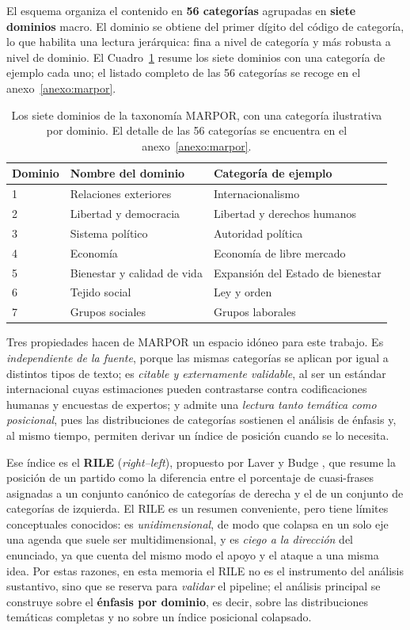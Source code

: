 El esquema organiza el contenido en \textbf{56 categorías} agrupadas en
\textbf{siete dominios} macro. El dominio se obtiene del primer dígito del código
de categoría, lo que habilita una lectura jerárquica: fina a nivel de categoría y
más robusta a nivel de dominio. El Cuadro~\ref{tab:marpor-dominios} resume los
siete dominios con una categoría de ejemplo cada uno; el listado completo de las
56 categorías se recoge en el anexo~\ref{anexo:marpor}.

\begin{table}[H]
\centering
\caption{Los siete dominios de la taxonomía MARPOR, con una categoría ilustrativa
por dominio. El detalle de las 56 categorías se encuentra en el
anexo~\ref{anexo:marpor}.}
\label{tab:marpor-dominios}
\small
\begin{tabularx}{\textwidth}{@{}l l >{\raggedright\arraybackslash}X@{}}
\toprule
\textbf{Dominio} & \textbf{Nombre del dominio} & \textbf{Categoría de ejemplo} \\
\midrule
1 & Relaciones exteriores & Internacionalismo \\
2 & Libertad y democracia & Libertad y derechos humanos \\
3 & Sistema político & Autoridad política \\
4 & Economía & Economía de libre mercado \\
5 & Bienestar y calidad de vida & Expansión del Estado de bienestar \\
6 & Tejido social & Ley y orden \\
7 & Grupos sociales & Grupos laborales \\
\bottomrule
\end{tabularx}
\end{table}

Tres propiedades hacen de MARPOR un espacio idóneo para este trabajo. Es
\emph{independiente de la fuente}, porque las mismas categorías se aplican por
igual a distintos tipos de texto; es \emph{citable y externamente validable}, al
ser un estándar internacional cuyas estimaciones pueden contrastarse contra
codificaciones humanas y encuestas de expertos; y admite una \emph{lectura tanto
temática como posicional}, pues las distribuciones de categorías sostienen el
análisis de énfasis y, al mismo tiempo, permiten derivar un índice de posición
cuando se lo necesita.

Ese índice es el \textbf{RILE} (\emph{right--left}), propuesto por Laver y Budge
\cite{laver1992party}, que resume la posición de un partido como la diferencia
entre el porcentaje de cuasi-frases asignadas a un conjunto canónico de
categorías de derecha y el de un conjunto de categorías de izquierda. El RILE es
un resumen conveniente, pero tiene límites conceptuales conocidos: es
\emph{unidimensional}, de modo que colapsa en un solo eje una agenda que suele ser
multidimensional, y es \emph{ciego a la dirección} del enunciado, ya que cuenta
del mismo modo el apoyo y el ataque a una misma idea. Por estas razones, en esta
memoria el RILE no es el instrumento del análisis sustantivo, sino que se reserva
para \emph{validar} el pipeline; el análisis principal se construye sobre el
\textbf{énfasis por dominio}, es decir, sobre las distribuciones temáticas
completas y no sobre un índice posicional colapsado.

